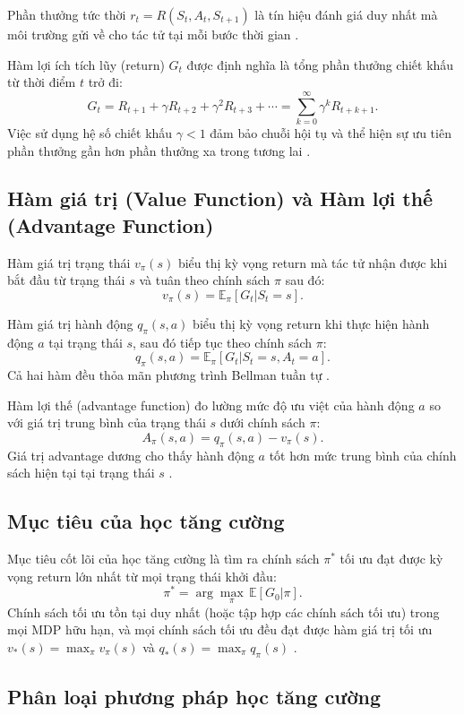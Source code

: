 \documentclass{uetgraduation}
\begin{document}
Phần thưởng tức thời $r_t = R(S_t, A_t, S_{t+1})$ là tín hiệu đánh giá duy nhất mà môi trường gửi về cho tác tử tại mỗi bước thời gian \cite{sutton2018}.

Hàm lợi ích tích lũy (return) $G_t$ được định nghĩa là tổng phần thưởng chiết khấu từ thời điểm $t$ trở đi:
\[
G_t = R_{t+1} + \gamma R_{t+2} + \gamma^2 R_{t+3} + \cdots = \sum_{k=0}^{\infty} \gamma^k R_{t+k+1}.
\]
Việc sử dụng hệ số chiết khấu $\gamma < 1$ đảm bảo chuỗi hội tụ và thể hiện sự ưu tiên phần thưởng gần hơn phần thưởng xa trong tương lai \cite{sutton2018}.

\subsection{Hàm giá trị (Value Function) và Hàm lợi thế (Advantage Function)}

Hàm giá trị trạng thái $v_\pi(s)$ biểu thị kỳ vọng return mà tác tử nhận được khi bắt đầu từ trạng thái $s$ và tuân theo chính sách $\pi$ sau đó:
\[
v_\pi(s) = \mathbb{E}_\pi [G_t | S_t = s].
\]

Hàm giá trị hành động $q_\pi(s,a)$ biểu thị kỳ vọng return khi thực hiện hành động $a$ tại trạng thái $s$, sau đó tiếp tục theo chính sách $\pi$:
\[
q_\pi(s,a) = \mathbb{E}_\pi [G_t | S_t = s, A_t = a].
\]
Cả hai hàm đều thỏa mãn phương trình Bellman tuần tự \cite{sutton2018}.

Hàm lợi thế (advantage function) đo lường mức độ ưu việt của hành động $a$ so với giá trị trung bình của trạng thái $s$ dưới chính sách $\pi$:
\[
A_\pi(s,a) = q_\pi(s,a) - v_\pi(s).
\]
Giá trị advantage dương cho thấy hành động $a$ tốt hơn mức trung bình của chính sách hiện tại tại trạng thái $s$ \cite{sutton2018}.

\subsection{Mục tiêu của học tăng cường}

Mục tiêu cốt lõi của học tăng cường là tìm ra chính sách $\pi^*$ tối ưu đạt được kỳ vọng return lớn nhất từ mọi trạng thái khởi đầu:
\[
\pi^* = \arg\max_\pi \, \mathbb{E} [G_0 | \pi].
\]
Chính sách tối ưu tồn tại duy nhất (hoặc tập hợp các chính sách tối ưu) trong mọi MDP hữu hạn, và mọi chính sách tối ưu đều đạt được hàm giá trị tối ưu $v_*(s) = \max_\pi v_\pi(s)$ và $q_*(s) = \max_\pi q_\pi(s)$ \cite{sutton2018}.

\subsection{Phân loại phương pháp học tăng cường}
\end{document}
